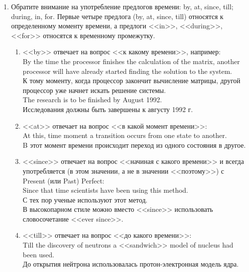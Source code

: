 \documentclass[a5paper, 10pt, twoside, numbers=enddot]{scrartcl}
\begin{document}
\begin{enumerate}
  \item Обратите внимание на употребление предлогов времени: by, at, since, till; during, in, for.
    Первые четыре предлога (by, at, since, till) относятся к определенному моменту времени, а
    предлоги <<in>>, <<during>>, <<for>> относятся к временному промежутку.
    \begin{enumerate}
      \item <<by>> отвечает на вопрос <<к какому времени>>, например:\\ [4pt]
        \textsf{
          By the time the processor finishes the calculation of the matrix, another processor will
          have already started finding the solution to the system.\\
          К тому моменту, когда процессор закончит вычисление матрицы, другой процессор уже начнет
          искать решение системы.\\ [4pt]
          The research is to be finished by August 1992.\\
          Исследования должны быть завершены к августу 1992 г.
        }

      \item <<at>> отвечает на вопрос <<в какой момент времени>>:\\ [4pt]
        \textsf{
          At this, time moment a transition occurs from one state to another.\\
          B этот момент времени происходит переход из одного состояния в другое.
        }

      \item <<since>> отвечает на вопрос <<начиная с какого времени>> и всегда употребляется (в этом
        значении, а не в значении <<поэтому>>) с Present (или Past) Perfect:\\ [4pt]
        \textsf{
          Since that time scientists have been using this method.\\
          С тех пор ученые используют этот метод.\\ [4pt]
        }
        В высокопарном стиле можно вместо <<since>> использовать словосочетание <<ever since>>.

      \item <<till>> отвечает на вопрос <<до какого времени>>:\\ [4pt]
        \textsf{
          Till the discovery of neutrons a <<sandwich>> model of nucleus had been used.\\
          До открытия нейтрона использовалась протон-электронная модель ядра.
        }


\end{enumerate}
\end{enumerate}
\end{document}
